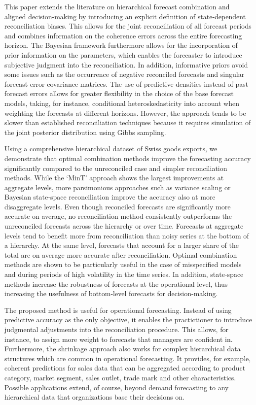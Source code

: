 \documentclass[a4paper,fleqn,11pt]{article}
\begin{document}
This paper extends the literature on hierarchical forecast combination and aligned decision-making by introducing an explicit definition of state-dependent reconciliation biases. This allows for the joint reconciliation of all forecast periods and combines information on the coherence errors across the entire forecasting horizon. The Bayesian framework furthermore allows for the incorporation of prior information on the parameters, which enables the forecaster to introduce subjective judgment into the reconciliation. In addition, informative priors avoid some issues such as the occurrence of negative reconciled forecasts and singular forecast error covariance matrices. The use of predictive densities instead of past forecast errors allows for greater flexibility in the choice of the base forecast models, taking, for instance, conditional heteroskedasticity into account when weighting the forecasts at different horizons. However, the approach tends to be slower than established reconciliation techniques because it requires simulation of the joint posterior distribution using Gibbs sampling.

Using a comprehensive hierarchical dataset of Swiss goods exports, we demonstrate that optimal combination methods improve the forecasting accuracy significantly compared to the unreconciled case and simpler reconciliation methods. While the `MinT' approach shows the largest improvements at aggregate levels, more parsimonious approaches such as variance scaling or Bayesian state-space reconciliation improve the accuracy also at more disaggregate levels. Even though reconciled forecasts are significantly more accurate on average, no reconciliation method consistently outperforms the unreconciled forecasts across the hierarchy or over time. Forecasts at aggregate levels tend to benefit more from reconciliation than noisy series at the bottom of a hierarchy. At the same level, forecasts that account for a larger share of the total are on average more accurate after reconciliation. Optimal combination methods are shown to be particularly useful in the case of misspecified models and during periods of high volatility in the time series. In addition, state-space methods increase the robustness of forecasts at the operational level, thus increasing the usefulness of bottom-level forecasts for decision-making.

The proposed method is useful for operational forecasting. Instead of using predictive accuracy as the only objective, it enables the practictioner to introduce judgmental adjustments into the reconciliation procedure. This allows, for instance, to assign more weight to forecasts that managers are confident in. Furthermore, the shrinkage approach also works for complex hierarchical data structures which are common in operational forecasting. It provides, for example, coherent predictions for sales data that can be aggregated according to product category, market segment, sales outlet, trade mark and other characteristics. Possible applications extend, of course, beyond demand forecasting to any hierarchical data that organizations base their decisions on. 





\end{document}
